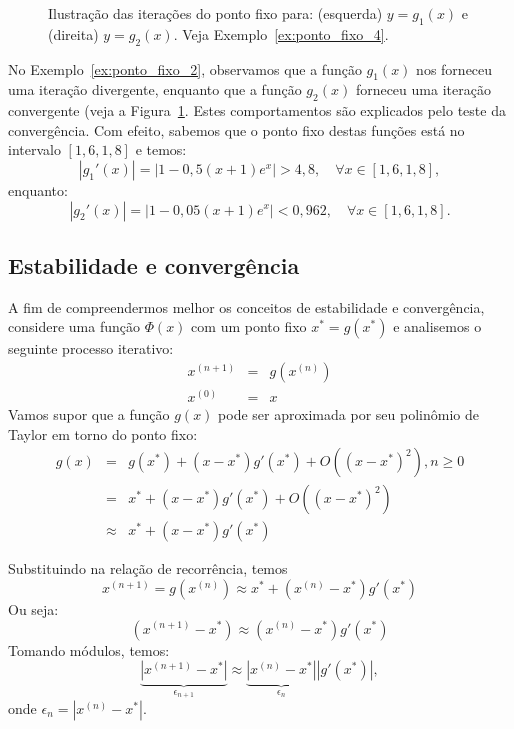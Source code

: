 \begin{figure}[h]
    \caption{Ilustração das iterações do ponto fixo para: (esquerda) $y = g_1(x)$ e (direita) $y = g_2(x)$. Veja Exemplo~\ref{ex:ponto_fixo_4}.} \label{fig:teste_de_convergencia}
\end{figure}

\begin{ex}\label{ex:ponto_fixo_4}
  No Exemplo~\ref{ex:ponto_fixo_2}, observamos que a função $g_1(x)$ nos forneceu uma iteração divergente, enquanto que a função $g_2(x)$ forneceu uma iteração convergente (veja a Figura~\ref{fig:teste_de_convergencia}. Estes comportamentos são explicados pelo teste da convergência. Com efeito, sabemos que o ponto fixo destas funções está no intervalo $[1,6, 1,8]$ e temos:
  \begin{equation*}
    |g_1'(x)| = |1 - 0,5(x+1)e^x| > 4,8,\quad\forall x\in [1,6, 1,8],
  \end{equation*}
enquanto:
\begin{equation*}
  |g_2'(x)| = |1 - 0,05(x+1)e^x| < 0,962,\quad\forall x\in [1,6, 1,8].
\end{equation*}
\end{ex}

\subsection{Estabilidade e convergência}

A fim de compreendermos melhor os conceitos de estabilidade e convergência, considere uma função $\Phi(x)$ com um ponto fixo $x^*=g(x^*)$ e analisemos o seguinte processo iterativo:
\begin{eqnarray*}
x^{(n+1)}&=&g\left(x^{(n)}\right)\\
x^{(0)}&=&x
\end{eqnarray*}
Vamos supor que a função $g(x)$ pode ser aproximada por seu polinômio de Taylor em torno do ponto fixo:
\begin{eqnarray*}
g(x)&=&g(x^*)+(x-x^*) g'(x^*)+O\left((x-x^*)^2\right), n\geq 0\\
&=&x^*+(x-x^*) g'(x^*)+O\left((x-x^*)^2\right)\\
&\approx& x^*+(x-x^*) g'(x^*)
\end{eqnarray*}

Substituindo na relação de recorrência, temos
$$
x^{(n+1)}=g\left(x^{(n)}\right)\approx x^*+(x^{(n)}-x^*) g'(x^*)
$$
Ou seja:
$$
\left(x^{(n+1)}-x^*\right)\approx {(x^{(n)}-x^*)} g'(x^*)
$$
Tomando módulos, temos:
$$
\underbrace{\left|x^{(n+1)}-x^*\right|}_{\epsilon_{n+1}}\approx \underbrace{\left|x^{(n)}-x^*\right|}_{\epsilon_n} \left|g'(x^*)\right|,
$$
onde $\epsilon_n=\left|x^{(n)}-x^*\right|$.

